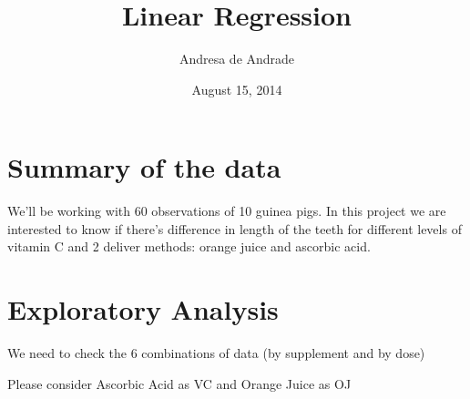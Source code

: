 \documentclass[]{article}
\title{Linear Regression}
\author{Andresa de Andrade}
\date{August 15, 2014}
\begin{document}
\maketitle


{
\hypersetup{linkcolor=black}
\setcounter{tocdepth}{2}
\tableofcontents
}
\newpage 

\section{Summary of the data}\label{summary-of-the-data}

We'll be working with 60 observations of 10 guinea pigs. In this project
we are interested to know if there's difference in length of the teeth
for different levels of vitamin C and 2 deliver methods: orange juice
and ascorbic acid.

\section{Exploratory Analysis}\label{exploratory-analysis}

We need to check the 6 combinations of data (by supplement and by dose)

Please consider Ascorbic Acid as VC and Orange Juice as OJ
\end{document}

